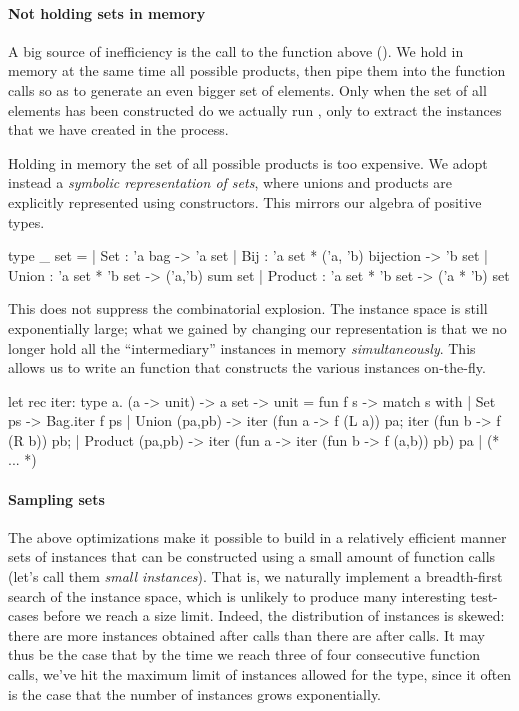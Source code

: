 \paragraph{Not holding sets in memory}
A big source of inefficiency is the call to the
 function above (). We hold in memory
at the same time all possible products, then pipe them into the function calls
so as to generate an even bigger set of elements. Only when the set of all
elements has been constructed do we actually run , only to
extract the instances that we have created in the process.

Holding in memory the set of all possible products is too expensive. We adopt
instead a \emph{symbolic representation of sets}, where unions and products are
explicitly represented using constructors. This mirrors our algebra of positive
types.
%
\begin{ocamlcode}
type _ set =
  | Set   : 'a bag -> 'a set
  | Bij   : 'a set * ('a, 'b) bijection -> 'b set
  | Union   : 'a set * 'b set -> ('a,'b) sum set
  | Product : 'a set * 'b set -> ('a * 'b) set
\end{ocamlcode}
%
This does not suppress the combinatorial explosion. The instance space is still
exponentially large; what we gained by changing our representation is that we
no longer hold all the ``intermediary'' instances in memory
\emph{simultaneously}. This allows us to write an  function that
constructs the various instances on-the-fly.
%
\begin{ocamlcode}
let rec iter: type a. (a -> unit) -> a set -> unit =
fun f s -> match s with
  | Set ps ->
      Bag.iter f ps
  | Union (pa,pb) ->
      iter (fun a -> f (L a)) pa;
      iter (fun b -> f (R b)) pb;
  | Product (pa,pb) ->
      iter (fun a -> iter (fun b -> f (a,b)) pb) pa
  | (* ... *)
\end{ocamlcode}
%

\paragraph{Sampling sets} The above optimizations make it possible to
build in a relatively efficient manner sets of instances that can be
constructed using a small amount of function calls (let's call them
\emph{small instances}). That is, we naturally implement a
breadth-first search of the instance space, which is unlikely to
produce many interesting test-cases before we reach a size limit.
%
Indeed, the distribution of instances is skewed: there are more
instances obtained after  calls than there are after
 calls. It may thus be the case that by the time we reach
three of four consecutive function calls, we've hit the maximum limit
of instances allowed for the type, since it often is the case that the
number of instances grows exponentially.

